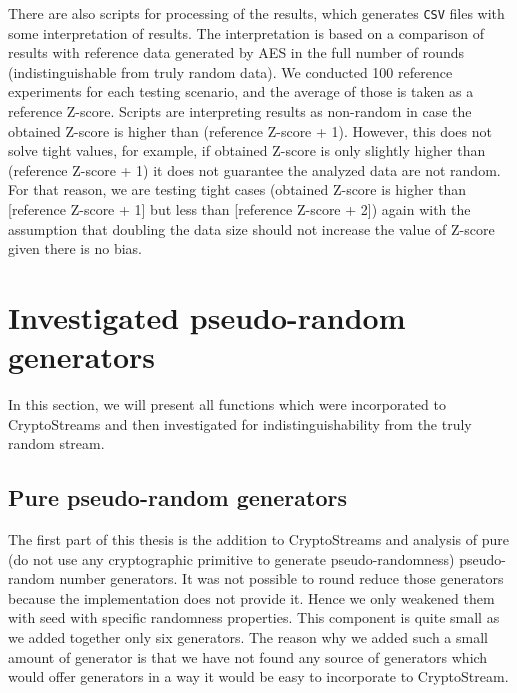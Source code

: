 \documentclass[
    digital,    %
    oneside,    %
    color,
    11pt,
    nocover,
    notable,
    nolof,
    nolot,
    final
]{fithesis3}
\renewcommand\_{\textunderscore\allowbreak}
\begin{document}
There are also scripts for processing of the results, which generates \texttt{CSV} files with some interpretation of results. The interpretation is based on a comparison of results with reference data generated by AES in the full number of rounds (indistinguishable from truly random data). We conducted 100 reference experiments for each testing scenario, and the average of those is taken as a reference Z-score. Scripts are interpreting results as non-random in case the obtained Z-score is higher than (reference Z-score + 1). However, this does not solve tight values, for example, if obtained Z-score is only slightly higher than (reference Z-score + 1) it does not guarantee the analyzed data are not random. For that reason, we are testing tight cases (obtained Z-score is higher than [reference Z-score + 1] but less than [reference Z-score + 2]) again with the assumption that doubling the data size should not increase the value of Z-score given there is no bias.

\section{Investigated pseudo-random generators}
\label{sec:added_pseudo_random_generators}

In this section, we will present all functions which were incorporated to CryptoStreams and then investigated for indistinguishability from the truly random stream.

\subsection{Pure pseudo-random generators}
\label{subsec:pure-generators}

The first part of this thesis is the addition to CryptoStreams and analysis of pure (do not use any cryptographic primitive to generate pseudo-randomness) pseudo-random number generators. It was not possible to round reduce those generators because the implementation does not provide it. Hence we only weakened them with seed with specific randomness properties. This component is quite small as we added together only six generators. The reason why we added such a small amount of generator is that we have not found any source of generators which would offer generators in a way it would be easy to incorporate to CryptoStream.
\end{document}
